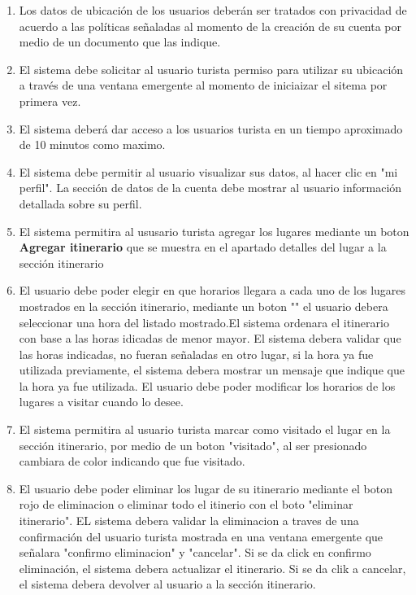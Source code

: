 \documentclass{article}
\begin{document}
\begin{enumerate}
    \item Los datos de ubicación de los usuarios deberán ser tratados con privacidad de acuerdo a las políticas señaladas al momento de la creación de su cuenta por medio de un documento que las indique.
    
    \item El sistema debe solicitar al usuario turista permiso para utilizar su ubicación a través de una ventana emergente al momento de iniciaizar el sitema por primera vez.
    
    \item El sistema deberá dar acceso a los usuarios turista en un tiempo aproximado de 10 minutos como maximo.

\item El sistema debe permitir al usuario visualizar sus datos, al hacer clic en "mi perfil". La sección de datos
de la cuenta debe mostrar al usuario información detallada sobre su perfil.

\item El sistema permitira al ususario turista agregar los lugares mediante un boton \textbf{Agregar itinerario} que se muestra en el apartado detalles del lugar a la sección itinerario

\item El usuario debe poder elegir en que horarios llegara a cada uno de los lugares mostrados en la sección itinerario, mediante un boton "" el usuario debera seleccionar una hora del listado mostrado.El sistema ordenara el itinerario con base a las horas idicadas de menor mayor. El sistema debera validar que las horas indicadas, no fueran señaladas en otro lugar, si la hora ya fue utilizada previamente, el sistema debera mostrar un mensaje que indique que la hora ya fue utilizada. El usuario debe poder modificar los horarios de los lugares a visitar cuando lo desee.

\item El sistema permitira al usuario turista marcar como visitado el lugar en la sección itinerario, por medio de un boton "visitado", al ser presionado cambiara de color indicando que fue visitado.  

\item El usuario debe poder eliminar los lugar de su itinerario mediante el boton rojo de eliminacion o eliminar todo el itinerio con el boto "eliminar itinerario". EL sistema debera validar la eliminacion a traves de una confirmación del usuario turista mostrada en una ventana emergente que señalara "confirmo eliminacion" y "cancelar". Si se da click en confirmo eliminación, el sistema debera actualizar el itinerario. Si se da clik a cancelar, el sistema debera devolver al usuario a la sección itinerario.


\end{enumerate}
\end{document}
